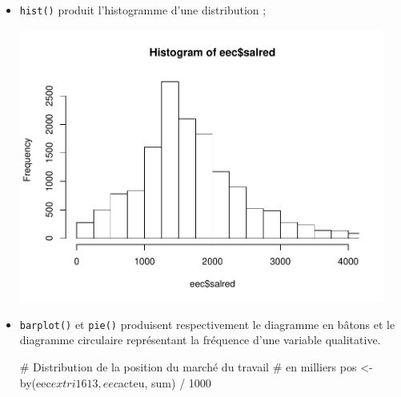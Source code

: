\documentclass[12pt,twosided, notitlepage]{book}
\newenvironment{Shaded}{}{}
\newcommand{\CommentTok}[1]{\textcolor[rgb]{0.00,0.50,0.00}{#1}}
\newcommand{\DataTypeTok}[1]{#1}
\newcommand{\DecValTok}[1]{#1}
\newcommand{\KeywordTok}[1]{\textcolor[rgb]{0.00,0.00,1.00}{#1}}
\newcommand{\NormalTok}[1]{#1}
\newcommand{\OperatorTok}[1]{#1}
\newcommand{\StringTok}[1]{\textcolor[rgb]{0.00,0.50,0.50}{#1}}
\renewenvironment{Shaded}{\begin{snugshade}}{\end{snugshade}}
\begin{document}
\begin{itemize}
\item
  \texttt{hist()} produit l'histogramme
  d'une distribution ;

\begin{Shaded}
\end{Shaded}

  \begin{center}\includegraphics[width=12cm]{livret_files/figure-latex/unnamed-chunk-442-1} \end{center}
\item
  \texttt{barplot()} et
  \texttt{pie()} produisent respectivement le
  diagramme en bâtons et le diagramme circulaire représentant la
  fréquence d'une variable qualitative.

\begin{Shaded}
\begin{Highlighting}[]
\CommentTok{# Distribution de la position du marché du travail}
\CommentTok{# en milliers}
\NormalTok{pos <-}\StringTok{ }\KeywordTok{by}\NormalTok{(eec}\OperatorTok{$}\NormalTok{extri1613, eec}\OperatorTok{$}\NormalTok{acteu, sum) }\OperatorTok{/}\StringTok{ }\DecValTok{1000}


\end{Highlighting}
\end{Shaded}
\end{itemize}
\end{document}
